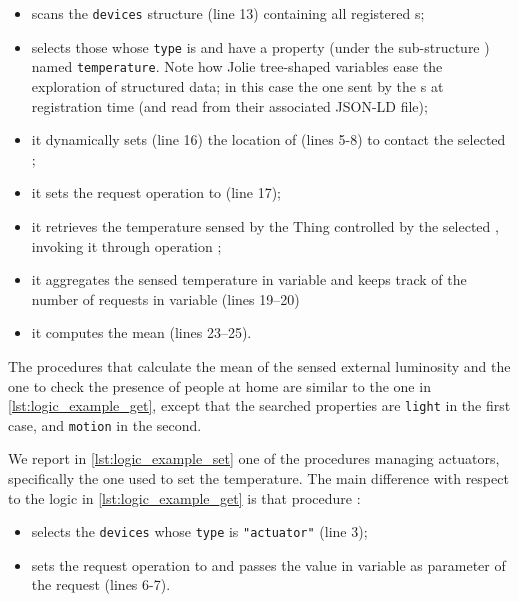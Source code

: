 \begin{itemize}
  \item scans the \lstinline{devices} structure (line 13) containing all
  registered s;
  \item selects those whose {\small\texttt{type}} is  and have
  a property (under the sub-structure ) named
  \lstinline{temperature}. Note how Jolie tree-shaped variables ease the
  exploration of structured data; in this case the one sent by the
  s at registration time (and read from their associated JSON-LD
  file);
  \item it dynamically sets (line 16) the location of 
  (lines 5-8) to contact the selected ;
  \item it sets the request operation to  (line 17);
  \item it retrieves the temperature sensed by the Thing controlled by the
  selected , invoking it through operation ;
  \item it aggregates the sensed temperature in variable  and keeps
  track of the number of requests in variable  (lines 19--20)
  \item it computes the mean  (lines 23--25).
\end{itemize}
%

The procedures that calculate the mean of the sensed external luminosity and
the one to check the presence of people at home are similar to the one in
\cref{lst:logic_example_get}, except that the searched properties are
\lstinline{light} in the first case, and \lstinline{motion} in the second.

We report in \cref{lst:logic_example_set} one of the procedures managing
actuators, specifically the one used to set the temperature. The main
difference with respect to the logic in \cref{lst:logic_example_get} is that
procedure : 

\begin{itemize}
  \item selects the \lstinline{devices} whose {\small \texttt{type}} is
  \lstinline{"actuator"} (line 3);
  \item sets the request operation to  and passes the value
  in variable  as parameter of the request
  (lines 6-7).
\end{itemize}

